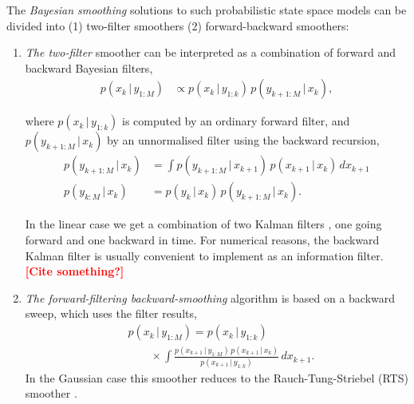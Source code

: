 \documentclass[twocolumn]{autart}    %
\newcommand{\comment}[1]{\textcolor{red}{\textbf{[#1]}}}
\begin{document}
The {\em Bayesian smoothing} solutions to such probabilistic state space models can be divided into (1) two-filter smoothers (2) forward-backward smoothers:
%
\begin{enumerate}
\item {\em The two-filter} smoother \cite{Lee:1964,Kitagawa:1994} can be interpreted as a combination of forward and backward Bayesian filters,
%
\begin{equation}
\begin{split}
  p(x_k \,|\, y_{1:M})
  &\propto
  p(x_k \,|\, y_{1:k}) \, p(y_{k+1:M} \,|\, x_k),
\end{split}
\end{equation}

where $p(x_k \,|\, y_{1:k})$ is computed by an ordinary forward filter, and $p(y_{k+1:M} \,|\, x_k)$ by an unnormalised filter using the backward recursion,
%
\begin{equation}
\begin{split}
  p(y_{k+1:M} \,|\, x_k)
  &= \int p(y_{k+1:M} \,|\, x_{k+1}) \, p(x_{k+1} \,|\, x_k) \,
          dx_{k+1} \\
  p(y_{k:M} \,|\, x_k)
  &= p(y_k \,|\, x_k) \, p(y_{k+1:M} \,|\, x_k).
\end{split}
\label{eq:tfsmooth}
\end{equation}

In the linear case we get a combination of two Kalman filters \cite{Fraser+Potter:1969}, one going forward and one backward in time. For numerical reasons, the backward Kalman filter is usually convenient to implement as an information filter. \comment{Cite something?}

\item {\em The forward-filtering backward-smoothing} algorithm   \cite{Kitagawa:1987} is based on a backward sweep, which uses the filter results,
%
\begin{equation}
\begin{split}
 &p(x_{k} \,|\, y_{1:M})
  = p(x_{k}\,|\,y_{1:k}) \\
 &\qquad \times \int
    \frac{p(x_{k+1} \,|\, y_{1:M}) \, p(x_{k+1}\,|\,x_{k})}
         {p(x_{k+1}\,|\,y_{1:k})} \, dx_{k+1}.
\end{split}
\label{eq:fbsmooth}
\end{equation}
%
In the Gaussian case this smoother reduces to the Rauch-Tung-Striebel (RTS) smoother \cite{Rauch+Tung+Striebel:1965}.
\end{enumerate}
\end{document}
